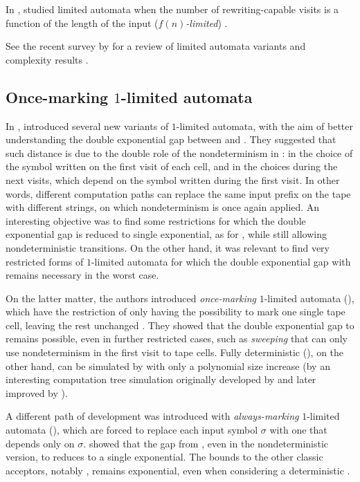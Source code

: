 In \citeyear{WecBra79}, \citeauthor{WecBra79} studied limited automata when the number of rewriting-capable visits is a function of the length of the input (\emph{$f(n)$-limited}) \cite{WecBra79}.

See the recent survey by \citeauthor{Pig19} for a review of limited automata variants and complexity results \cite{Pig19}.


\subsection{Once-marking \texorpdfstring{$1$}{1}-limited automata}
In \citeyear{PigPri23a}, \citeauthor{PigPri23a} introduced several new variants of $1$-limited automata, with the aim of better understanding the double exponential gap between \OLA and \ODFA \cite{PigPri23a,PigPri23}.
They suggested that such distance is due to the double role of the nondeterminism in \OLAs: in the choice of the symbol written on the first visit of each cell, and in the choices during the next visits, which depend on the symbol written during the first visit.
In other words, different computation paths can replace the same input prefix on the tape with different strings, on which nondeterminism is once again applied.
An interesting objective was to find some restrictions for which the double exponential gap is reduced to single exponential, as for \ODLA, while still allowing nondeterministic transitions.
On the other hand, it was relevant to find very restricted forms of $1$-limited automata for which the double exponential gap with \ODFA remains necessary in the worst case.

On the latter matter, the authors introduced \emph{once-marking} $1$-limited automata (\OMOLA), which have the restriction of only having the possibility to mark one single tape cell, leaving the rest unchanged \cite{PigPri23}.
They showed that the double exponential gap to \ODFA remains possible, even in further restricted cases, such as \emph{sweeping} \OMOLA that can only use nondeterminism in the first visit to tape cells.
Fully deterministic \OMOLA (\OMODLA), on the other hand, can be simulated by \TDFAs with only a polynomial size increase (by an interesting computation tree simulation originally developed by \citeauthor{Sip80a} and later improved by \citeauthor{GefMer+07} \cite{Sip80a,GefMer+07}).

A different path of development was introduced with \emph{always-marking} $1$-limited automata (\AMOLA), which are forced to replace each input symbol $\sigma$ with one that depends only on $\sigma$.
\citeauthor{PigPri23a} showed that the gap from \AMOLA, even in the nondeterministic version, to \ODFA reduces to a single exponential.
The bounds to the other classic acceptors, notably \TNFA, remains exponential, even when considering a deterministic \AMOLA.

